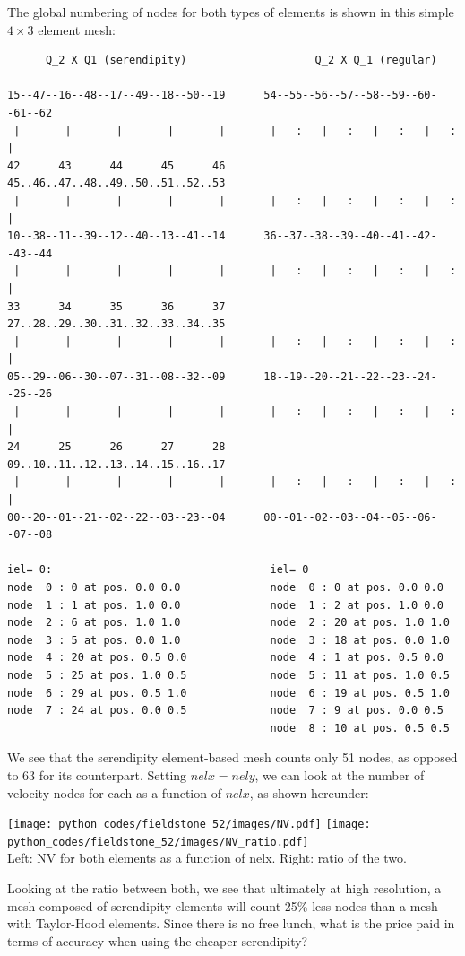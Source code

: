 The global numbering of nodes for both types of elements is shown  
in this simple $4\times 3$ element mesh:

\begin{verbatim}
      Q_2 X Q1 (serendipity)                    Q_2 X Q_1 (regular)

15--47--16--48--17--49--18--50--19      54--55--56--57--58--59--60--61--62
 |       |       |       |       |       |   :   |   :   |   :   |   :   |
42      43      44      45      46      45..46..47..48..49..50..51..52..53
 |       |       |       |       |       |   :   |   :   |   :   |   :   |
10--38--11--39--12--40--13--41--14      36--37--38--39--40--41--42--43--44
 |       |       |       |       |       |   :   |   :   |   :   |   :   |
33      34      35      36      37      27..28..29..30..31..32..33..34..35
 |       |       |       |       |       |   :   |   :   |   :   |   :   |
05--29--06--30--07--31--08--32--09      18--19--20--21--22--23--24--25--26
 |       |       |       |       |       |   :   |   :   |   :   |   :   |
24      25      26      27      28      09..10..11..12..13..14..15..16..17
 |       |       |       |       |       |   :   |   :   |   :   |   :   |
00--20--01--21--02--22--03--23--04      00--01--02--03--04--05--06--07--08

iel= 0:                                  iel= 0
node  0 : 0 at pos. 0.0 0.0              node  0 : 0 at pos. 0.0 0.0
node  1 : 1 at pos. 1.0 0.0              node  1 : 2 at pos. 1.0 0.0
node  2 : 6 at pos. 1.0 1.0              node  2 : 20 at pos. 1.0 1.0
node  3 : 5 at pos. 0.0 1.0              node  3 : 18 at pos. 0.0 1.0
node  4 : 20 at pos. 0.5 0.0             node  4 : 1 at pos. 0.5 0.0
node  5 : 25 at pos. 1.0 0.5             node  5 : 11 at pos. 1.0 0.5
node  6 : 29 at pos. 0.5 1.0             node  6 : 19 at pos. 0.5 1.0
node  7 : 24 at pos. 0.0 0.5             node  7 : 9 at pos. 0.0 0.5
                                         node  8 : 10 at pos. 0.5 0.5
\end{verbatim}

We see that the serendipity element-based mesh counts only 51 nodes, as
opposed to 63 for its counterpart.
Setting $nelx=nely$, we can look at the number of velocity nodes for each 
as a function of $nelx$, as shown hereunder:

\begin{center}
\texttt{[image: python\_codes/fieldstone\_52/images/NV.pdf]}
\texttt{[image: python\_codes/fieldstone\_52/images/NV\_ratio.pdf]}\\
{\captionfont Left: NV for both elements as a function of nelx. Right: ratio of the 
two.}
\end{center}
Looking at the ratio between both, we see that ultimately 
at high resolution, a mesh composed of serendipity elements 
will count 25\% less nodes than a mesh with Taylor-Hood elements.
Since there is no free lunch, what is the price paid in terms of accuracy when using 
the cheaper serendipity? 

